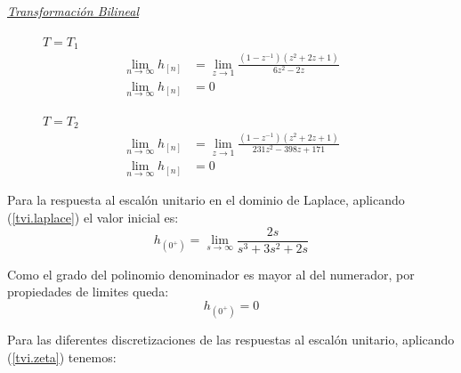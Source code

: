\documentclass[a4paper,12pt]{report}
\begin{document}
\begin{enumerate}[label=\alph*), left=0pt]
                {\centering\underline{\textit{Transformación Bilineal}}\par}
                \begin{figure}[h!]
                    \centering
                    \begin{minipage}{0.4\textwidth}
                        \centering
                        $T = T_1$
                        \begin{align*}
                            \lim_{n \to \infty} h_{[n]} &= \lim_{z \to 1}  \frac{\left(1 - z^{-1}\right) 
                                \left(z^2 + 2z + 1\right)}{6z^2 - 2z}\\
                            \lim_{n \to \infty} h_{[n]} &= 0
                        \end{align*}
                    \end{minipage}
                    \hspace{0.5cm}
                    \begin{minipage}{0.4\textwidth}
                        \centering
                        $T = T_2$
                        \begin{align*}
                            \lim_{n \to \infty} h_{[n]} &= \lim_{z \to 1} \frac{\left(1 - z^{-1}\right)
                                \left(z^2 + 2z + 1\right)}{231z^2 - 398z + 171}\\
                            \lim_{n \to \infty} h_{[n]} &= 0
                        \end{align*}
                    \end{minipage}
                \end{figure}

                Para la respuesta al escalón unitario en el dominio de Laplace, aplicando (\ref{tvi.laplace}) el valor inicial es:
                \begin{equation*}
                    h_{(0^+)} = \lim_{s \to \infty} \frac{2s}{s^3 + 3s^2 + 2s}
                \end{equation*}

                Como el grado del polinomio denominador es mayor al del numerador, por propiedades de limites queda:
                \begin{equation*}
                    h_{(0^+)} = 0
                \end{equation*}

                Para las diferentes discretizaciones de las respuestas al escalón unitario, aplicando (\ref{tvi.zeta}) tenemos:


\end{enumerate}
\end{document}

